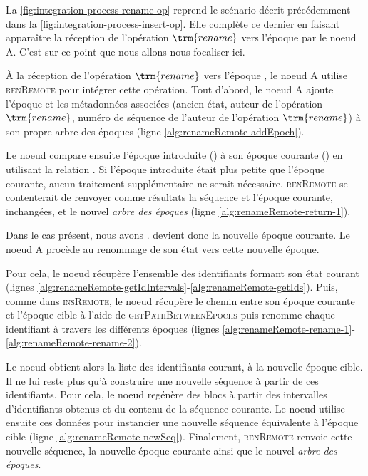 La \autoref{fig:integration-process-rename-op} reprend le scénario décrit précédemment dans la \autoref{fig:integration-process-insert-op}.
Elle complète ce dernier en faisant apparaître la réception de l'opération $\trm{rename}$ vers l'époque  par le noeud A.
C'est sur ce point que nous allons nous focaliser ici.

À la réception de l'opération $\trm{rename}$ vers l'époque , le noeud A utilise \textsc{renRemote} pour intégrer cette opération.
Tout d'abord, le noeud A ajoute l'époque  et les métadonnées associées (ancien état, auteur de l'opération $\trm{rename}$, numéro de séquence de l'auteur de l'opération $\trm{rename}$) à son propre arbre des époques (ligne \ref{alg:renameRemote-addEpoch}).

Le noeud compare ensuite l'époque introduite () à son époque courante () en utilisant la relation \lepoch.
Si l'époque introduite était plus petite que l'époque courante, aucun traitement supplémentaire ne serait nécessaire.
\textsc{renRemote} se contenterait de renvoyer comme résultats la séquence et l'époque courante, inchangées, et le nouvel \emph{arbre des époques} (ligne \ref{alg:renameRemote-return-1}).

Dans le cas présent, nous avons  \lepoch {}.
 devient donc la nouvelle époque courante.
Le noeud A procède au renommage de son état vers cette nouvelle époque.

Pour cela, le noeud récupère l'ensemble des identifiants formant son état courant (lignes \ref{alg:renameRemote-getIdIntervals}-\ref{alg:renameRemote-getIds}).
Puis, comme dans \textsc{insRemote}, le noeud récupère le chemin entre son époque courante et l'époque cible à l'aide de \textsc{getPathBetweenEpochs} puis renomme chaque identifiant à travers les différents époques (lignes \ref{alg:renameRemote-rename-1}-\ref{alg:renameRemote-rename-2}).

Le noeud obtient alors la liste des identifiants courant, à la nouvelle époque cible.
Il ne lui reste plus qu'à construire une nouvelle séquence à partir de ces identifiants.
Pour cela, le noeud regénère des blocs à partir des intervalles d'identifiants obtenus et du contenu de la séquence courante.
Le noeud utilise ensuite ces données pour instancier une nouvelle séquence équivalente à l'époque cible (ligne \ref{alg:renameRemote-newSeq}).
Finalement, \textsc{renRemote} renvoie cette nouvelle séquence, la nouvelle époque courante ainsi que le nouvel \emph{arbre des époques}.
